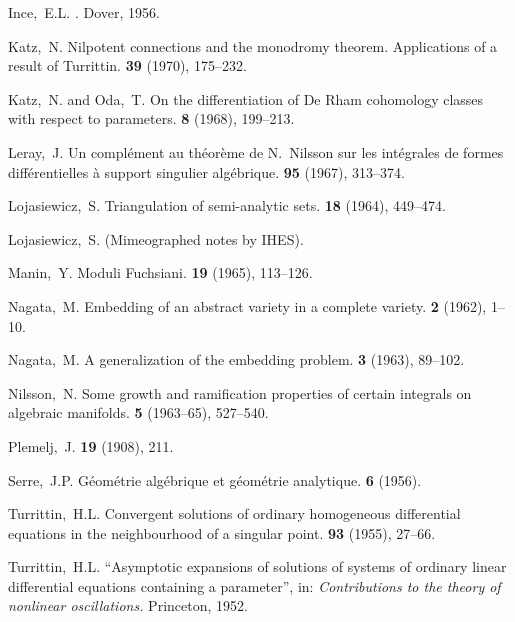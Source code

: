 \documentclass{report}
\theoremstyle{plain}
\theoremstyle{definition}
\begin{document}
\begin{thebibliography}{26}
  {\sc Ince,~E.L.}
  .
  \newblock Dover, 1956.

  {\sc Katz,~N.}
  \newblock Nilpotent connections and the monodromy theorem. Applications of a result of Turrittin.
   \textbf{39} (1970), 175--232.

  {\sc Katz,~N. and Oda,~T.}
  \newblock On the differentiation of De Rham cohomology classes with respect to parameters.
   \textbf{8} (1968), 199--213.

  {\sc Leray,~J.}
  \newblock Un compl\'{e}ment au th\'{e}or\`{e}me de N.~Nilsson sur les int\'{e}grales de formes diff\'{e}rentielles \`{a} support singulier alg\'{e}brique.
   \textbf{95} (1967), 313--374.

  {\sc Lojasiewicz,~S.}
  \newblock Triangulation of semi-analytic sets.
   \textbf{18} (1964), 449--474.

  {\sc Lojasiewicz,~S.}
  \newblock (Mimeographed notes by IHES).

  {\sc Manin,~Y.}
  \newblock Moduli Fuchsiani.
   \textbf{19} (1965), 113--126.

  {\sc Nagata,~M.}
  \newblock Embedding of an abstract variety in a complete variety.
   \textbf{2} (1962), 1--10.

  {\sc Nagata,~M.}
  \newblock A generalization of the embedding problem.
   \textbf{3} (1963), 89--102.

  {\sc Nilsson,~N.}
  \newblock Some growth and ramification properties of certain integrals on algebraic manifolds.
   \textbf{5} (1963--65), 527--540.

  {\sc Plemelj,~J.}
   \textbf{19} (1908), 211.

  {\sc Serre,~J.P.}
  \newblock Géométrie algébrique et géométrie analytique.
   \textbf{6} (1956).

  {\sc Turrittin,~H.L.}
  \newblock Convergent solutions of ordinary homogeneous differential equations in the neighbourhood of a singular point.
   \textbf{93} (1955), 27--66.

  {\sc Turrittin,~H.L.}
  \newblock ``Asymptotic expansions of solutions of systems of ordinary linear differential equations containing a parameter'', in: {\em Contributions to the theory of nonlinear oscillations.}
  \newblock Princeton, 1952.

\end{thebibliography}
\end{document}
